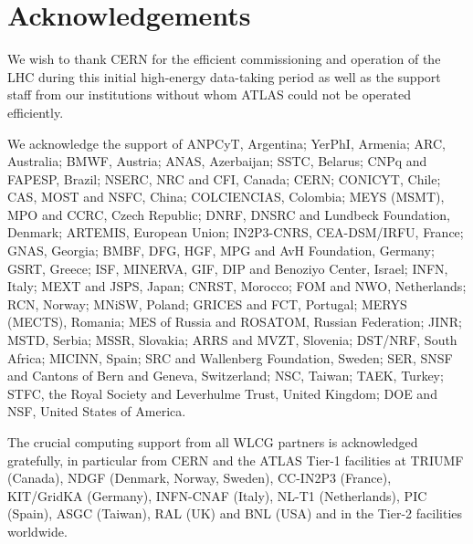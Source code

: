 \documentclass[11pt,a4paper,dvips]{article}
\begin{document}
\section{Acknowledgements}

We wish to thank CERN for the efficient commissioning and operation of the LHC during this initial high-energy data-taking period as well as the support staff from our institutions without whom ATLAS could not be operated efficiently.

We acknowledge the support of ANPCyT, Argentina; YerPhI, Armenia; ARC, Australia; BMWF, Austria; ANAS, Azerbaijan; SSTC, Belarus; CNPq and FAPESP, Brazil; NSERC, NRC and CFI, Canada; CERN; CONICYT, Chile; CAS, MOST and NSFC, China; COLCIENCIAS, Colombia; MEYS (MSMT), MPO and CCRC, Czech Republic; DNRF, DNSRC and Lundbeck Foundation, Denmark; ARTEMIS, European Union; IN2P3-CNRS, CEA-DSM/IRFU, France; GNAS, Georgia; BMBF, DFG, HGF, MPG and AvH Foundation, Germany; GSRT, Greece; ISF, MINERVA, GIF, DIP and Benoziyo Center, Israel; INFN, Italy; MEXT and JSPS, Japan; CNRST, Morocco; FOM and NWO, Netherlands; RCN, Norway;  MNiSW, Poland; GRICES and FCT, Portugal;  MERYS (MECTS), Romania;  MES of Russia and ROSATOM, Russian Federation; JINR; MSTD, Serbia; MSSR, Slovakia; ARRS and MVZT, Slovenia; DST/NRF, South Africa; MICINN, Spain; SRC and Wallenberg Foundation, Sweden; SER,  SNSF and Cantons of Bern and Geneva, Switzerland;  NSC, Taiwan; TAEK, Turkey; STFC, the Royal Society and Leverhulme Trust, United Kingdom; DOE and NSF, United States of America.  

The crucial computing support from all WLCG partners is acknowledged gratefully, in particular from CERN and the ATLAS Tier-1 facilities at TRIUMF (Canada), NDGF (Denmark, Norway, Sweden), CC-IN2P3 (France), KIT/GridKA (Germany), INFN-CNAF (Italy), NL-T1 (Netherlands), PIC (Spain), ASGC (Taiwan), RAL (UK) and BNL (USA) and in the Tier-2 facilities worldwide.
\end{document}
